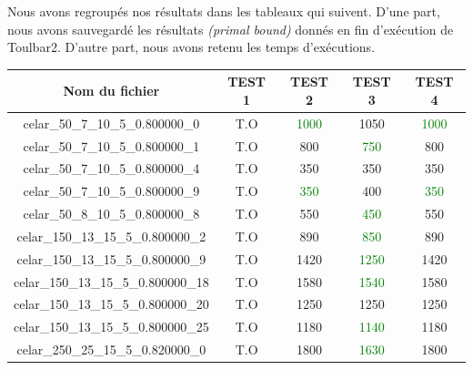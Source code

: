\documentclass[a4paper, 10pt]{article}
\begin{document}
      Nous avons regroupés nos résultats dans les tableaux qui suivent. D'une part, nous avons sauvegardé les résultats \textit{(primal bound)} donnés en fin d'exécution de Toulbar2. D'autre part, nous avons retenu les temps d'exécutions.

        \begin{minipage}[t]{0.5\linewidth}
          \footnotesize
            \begin{tabular}{| c | c | c| c| c |}
              \hline
              \textbf{Nom du fichier} & \textbf{TEST 1} & \textbf{TEST 2} & \textbf{TEST 3} & \textbf{TEST 4} \\
              \hline
              celar\_50\_7\_10\_5\_0.800000\_0 & \textcolor[gray]{0.6}{T.O}  & \textcolor{green}{1000} & 1050 & \textcolor{green}{1000}  \\
              \hline
              celar\_50\_7\_10\_5\_0.800000\_1 &  \textcolor[gray]{0.6}{T.O} & 800 & \textcolor{green}{750} & 800 \\
              \hline
              celar\_50\_7\_10\_5\_0.800000\_4 & \textcolor[gray]{0.6}{T.O}  & 350 & 350 & 350 \\
              \hline
              celar\_50\_7\_10\_5\_0.800000\_9 & \textcolor[gray]{0.6}{T.O}  & \textcolor{green}{350} & 400  & \textcolor{green}{350}  \\
              \hline
              celar\_50\_8\_10\_5\_0.800000\_8 & \textcolor[gray]{0.6}{T.O} & 550 & \textcolor{green}{450} & 550 \\
              \hline
              celar\_150\_13\_15\_5\_0.800000\_2 & \textcolor[gray]{0.6}{T.O} & 890 & \textcolor{green}{850} & 890\\
              \hline
              celar\_150\_13\_15\_5\_0.800000\_9 & \textcolor[gray]{0.6}{T.O} & 1420 & \textcolor{green}{1250} & 1420 \\
              \hline
              celar\_150\_13\_15\_5\_0.800000\_18 & \textcolor[gray]{0.6}{T.O} & 1580 & \textcolor{green}{1540} & 1580 \\
              \hline
              celar\_150\_13\_15\_5\_0.800000\_20 & \textcolor[gray]{0.6}{T.O} & 1250 & 1250 & 1250\\
              \hline
              celar\_150\_13\_15\_5\_0.800000\_25 & \textcolor[gray]{0.6}{T.O} & 1180 & \textcolor{green}{1140} & 1180 \\
              \hline
              celar\_250\_25\_15\_5\_0.820000\_0 & \textcolor[gray]{0.6}{T.O} & 1800 & \textcolor{green}{1630} & 1800\\

\end{tabular}
\end{minipage}
\end{document}
